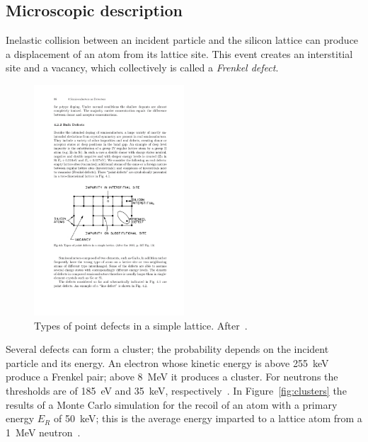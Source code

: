 \subsection{Microscopic description}
Inelastic collision between an incident particle and the silicon lattice can produce a displacement 
of an atom from its lattice site. This event creates an interstitial site and a vacancy, which 
collectively is called a {\it Frenkel defect}. 

\begin{figure}[!htbp]
\centering
\includegraphics[width=0.5\textwidth]{Interstitial.pdf}
\caption{\label{fig:Interstitial}Types of point defects in a simple lattice. After~\cite{Lutz:411172}.}
\end{figure}


Several defects can form a cluster; the probability 
depends on the incident particle and its energy. 
An electron whose kinetic energy is above 255~keV produce a Frenkel pair; above 8~MeV it 
produces a cluster. For neutrons the thresholds are of 185~eV and 35~keV, 
respectively~\cite{moll-thesis}. In Figure~\ref{fig:clusters} the results of a Monte Carlo simulation 
for the recoil of an atom with a primary energy $E_R$ of 50~keV; this is the average energy imparted 
to a lattice atom from a 1~MeV neutron~\cite{moll-thesis}.


